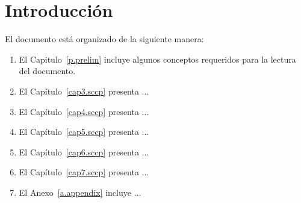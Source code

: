\chapter{Introducci\'on}
\label{cha.intro}

El documento est\'a organizado de la siguiente manera:

\begin{enumerate}
   \item El Capitulo~\ref{p.prelim} incluye algunos conceptos requeridos
	para la lectura del documento.

   \item El Cap\'itulo~\ref{cap3.sccp} presenta ...
   \item El Cap\'itulo~\ref{cap4.sccp} presenta ...
   \item El Cap\'itulo~\ref{cap5.sccp} presenta ...
   \item El Cap\'itulo~\ref{cap6.sccp} presenta ...
   \item El Cap\'itulo~\ref{cap7.sccp} presenta ...

   \item El Anexo~\ref{a.appendix} incluye ...
\end{enumerate}

